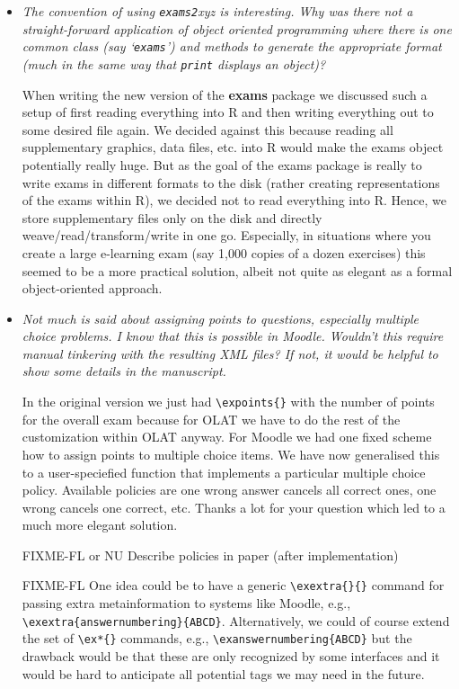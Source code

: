 \documentclass[a4paper]{article}
\begin{document}
\begin{itemize}

\item {\it
The convention of using \texttt{exams2}xyz is interesting. Why was there not a
straight-forward application of object oriented programming where there is
one common class (say `\texttt{exams}') and methods to generate the appropriate
format (much in the same way that \texttt{print} displays an object)?}

When writing the new version of the \textbf{exams} package we discussed such a setup
of first reading everything into R and then writing everything out to some
desired file again. We decided against this because reading all supplementary
graphics, data files, etc. into R would make the exams object potentially
really huge. But as the goal of the exams package is really to write exams
in different formats to the disk (rather creating representations of the
exams within R), we decided not to read everything into R. Hence, we store
supplementary files only on the disk and directly weave/read/transform/write
in one go. Especially, in situations where you create a large e-learning exam
(say 1,000 copies of a dozen exercises) this seemed to be a more practical
solution, albeit not quite as elegant as a formal object-oriented approach.
 
\item {\it
Not much is said about assigning points to questions, especially
multiple choice problems. I know that this is possible in Moodle. Wouldn't
this require manual tinkering with the resulting XML files? If not, it
would be helpful to show some details in the manuscript.}

In the original version we just had \verb|\expoints{}| with the number of
points for the overall exam because for OLAT we have to do the rest of
the customization within OLAT anyway. For Moodle we had one fixed
scheme how to assign points to multiple choice items. We have now
generalised this to a user-speciefied function that implements a
particular multiple choice policy. Available policies are one wrong
answer cancels all correct ones, one wrong cancels one correct,
etc. Thanks a lot for your question which led to a much more elegant
solution.

FIXME-FL or NU
Describe policies in paper (after implementation)

FIXME-FL
One idea could be to have a generic \verb|\exextra{}{}| command for passing extra
metainformation to systems like Moodle, e.g., \verb|\exextra{answernumbering}{ABCD}|.
Alternatively, we could of course extend the set of \verb|\ex*{}| commands, e.g.,
\verb|\exanswernumbering{ABCD}| but the drawback would be that these are only recognized
by some interfaces and it would be hard to anticipate all potential tags
we may need in the future.


\end{itemize}
\end{document}
